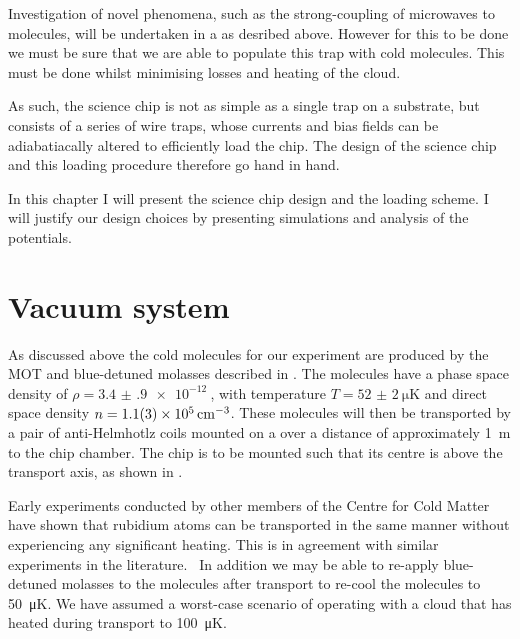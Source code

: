 
Investigation of novel phenomena, such as the strong-coupling of microwaves to
molecules, will be undertaken in a  as desribed above. However
for this to be done we must be sure that we are able to populate this trap with
cold molecules. This must be done whilst minimising losses and heating of the
cloud.

As such, the science chip is not as simple as a single trap on a substrate, but
consists of a series of wire traps, whose currents and bias fields can be
adiabatiacally altered to efficiently load the chip. The design of the science
chip and this loading procedure therefore go hand in hand.

In this chapter I will present the science chip design and the loading scheme.
I will justify our design choices by presenting simulations and analysis of the
potentials. 



\section{Vacuum system}


As discussed above  the cold \CaF{} molecules for our experiment
are produced by the MOT and blue-detuned molasses described in
. The molecules have a phase space density of
$\rho=\SI{3.4(9)e-12}{}$, with temperature $T=\SI{52(2)}{\micro\kelvin}$ and
direct space density $n=\SI{1.1(3)E5}{\per\centi\meter\cubed}$. These molecules
will then be transported by a pair of anti-Helmhotlz coils mounted on a
 over a distance of approximately \SI{1}{\meter} to the chip chamber.
The chip is to be mounted such that its centre is 
above the transport axis, as shown in .

Early experiments conducted by other members of the Centre for Cold Matter have
shown that rubidium atoms can be transported in the same manner without
experiencing any significant heating. This is in agreement with similar
experiments in the literature.~\cite{} In addition we may be able to re-apply
blue-detuned molasses to the molecules after transport to re-cool the molecules
to \SI{50}{\micro\kelvin}. We have assumed a worst-case scenario of operating
with a cloud that has heated during transport to \SI{100}{\micro\kelvin}.

